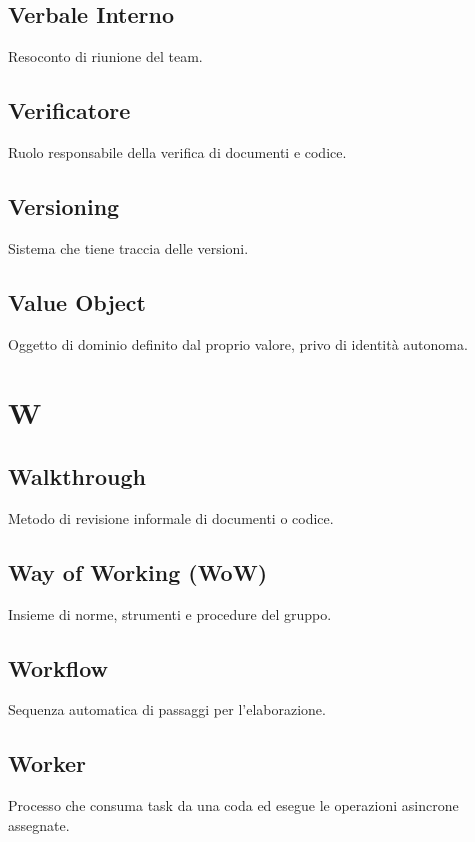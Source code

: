 \documentclass[a4paper,12pt]{article}
\begin{document}
\subsection{Verbale Interno}
Resoconto di riunione del team.

\subsection{Verificatore}
Ruolo responsabile della verifica di documenti e codice.

\subsection{Versioning}
Sistema che tiene traccia delle versioni.

\subsection{Value Object}
Oggetto di dominio definito dal proprio valore, privo di identità autonoma.

\section{W}
\subsection{Walkthrough}
Metodo di revisione informale di documenti o codice.

\subsection{Way of Working (WoW)}
Insieme di norme, strumenti e procedure del gruppo.

\subsection{Workflow}
Sequenza automatica di passaggi per l'elaborazione.

\subsection{Worker}
Processo che consuma task da una coda ed esegue le operazioni asincrone assegnate.
\end{document}
